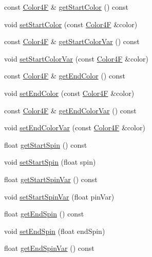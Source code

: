 \begin{DoxyCompactItemize}
\item 
const \hyperlink{structColor4F}{Color4F} \& \hyperlink{classParticleSystem_ae7a393fb67ce47a73228e0a299604909}{get\+Start\+Color} () const
\item 
void \hyperlink{classParticleSystem_a9a8cfdb5e2ef4a33ec198a58cfe31e19}{set\+Start\+Color} (const \hyperlink{structColor4F}{Color4F} \&color)
\item 
const \hyperlink{structColor4F}{Color4F} \& \hyperlink{classParticleSystem_a30038c34a4837c9aabd204971d8be99a}{get\+Start\+Color\+Var} () const
\item 
void \hyperlink{classParticleSystem_ac18c55ba53459fe1c48ba14bdd2f2924}{set\+Start\+Color\+Var} (const \hyperlink{structColor4F}{Color4F} \&color)
\item 
const \hyperlink{structColor4F}{Color4F} \& \hyperlink{classParticleSystem_ae7213ec605cb6436ccde6b243961869c}{get\+End\+Color} () const
\item 
void \hyperlink{classParticleSystem_a09c4f2ca4f9386d00a4e852de96bfa9c}{set\+End\+Color} (const \hyperlink{structColor4F}{Color4F} \&color)
\item 
const \hyperlink{structColor4F}{Color4F} \& \hyperlink{classParticleSystem_a64ebc762eeee90b936bbcf63359b3fce}{get\+End\+Color\+Var} () const
\item 
void \hyperlink{classParticleSystem_a97c0354219c2fdc0451a99ce25484b3d}{set\+End\+Color\+Var} (const \hyperlink{structColor4F}{Color4F} \&color)
\item 
float \hyperlink{classParticleSystem_a980f2d469eb4e458a9821b0519781daf}{get\+Start\+Spin} () const
\item 
void \hyperlink{classParticleSystem_a2a6b02e437565c2dcc70d237c7c1c23a}{set\+Start\+Spin} (float spin)
\item 
float \hyperlink{classParticleSystem_a651809def8e49f9e4a2acb9736fd4beb}{get\+Start\+Spin\+Var} () const
\item 
void \hyperlink{classParticleSystem_a3aff3de1fe852501893966352c7ccd37}{set\+Start\+Spin\+Var} (float pin\+Var)
\item 
float \hyperlink{classParticleSystem_a2e9d4d703536adc24dda1b06d8472649}{get\+End\+Spin} () const
\item 
void \hyperlink{classParticleSystem_ad79df08329c6f08e0223111eae6b65e0}{set\+End\+Spin} (float end\+Spin)
\item 
float \hyperlink{classParticleSystem_a2ce1e5241e35f6b686cdbff0cc30fc2e}{get\+End\+Spin\+Var} () const
\item 

\end{DoxyCompactItemize}
